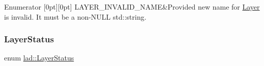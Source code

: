 \begin{DoxyEnumFields}{Enumerator}
[0pt][0pt]{}\mbox{\label{namespacelad_ab6fa4f89aae36d4017d361f561c23fb2add2291b39f8d85f19fb6febbc945dc1b}} 
L\+A\+Y\+E\+R\+\_\+\+I\+N\+V\+A\+L\+I\+D\+\_\+\+N\+A\+ME&Provided new name for \hyperlink{classlad_1_1_layer}{Layer} is invalid. It must be a non-\/\+N\+U\+LL std\+::string. \\
\hline

\end{DoxyEnumFields}
\mbox{\label{namespacelad_adf170a4dcc28fe5e14432157c9a5cbb3}} 
\subsubsection{\texorpdfstring{Layer\+Status}{LayerStatus}}
{\footnotesize\ttfamily enum \hyperlink{namespacelad_adf170a4dcc28fe5e14432157c9a5cbb3}{lad\+::\+Layer\+Status}}

